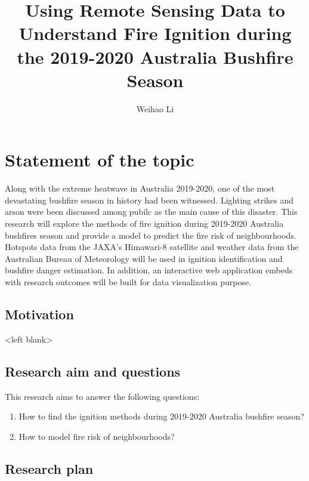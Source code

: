 \documentclass{monashthesis}
\author{Weihao Li}
\title{Using Remote Sensing Data to Understand Fire Ignition during the
2019-2020 Australia Bushfire Season}
\begin{document}

\titlepage

{\sf\tighttoc\doublespacing}

\clearpage{}\setcounter{page}{0}

\chapter{Statement of the topic}\label{ch:intro}

Along with the extreme heatwave in Australia 2019-2020, one of the most
devastating bushfire season in history had been witnessed. Lighting
strikes and arson were been discussed among pubilc as the main cause of
this disaster. This research will explore the methods of fire ignition
during 2019-2020 Australia bushfires season and provide a model to
predict the fire risk of neighbourhoods. Hotspots data from the JAXA's
Himawari-8 satellite and weather data from the Australian Bureau of
Meteorology will be used in ignition identification and bushfire danger
estimation. In addition, an interactive web application embeds with
research outcomes will be built for data visualization purpose.

\section{Motivation}\label{motivation}

\textless{}left blank\textgreater{}

\section{Research aim and questions}\label{research-aim-and-questions}

This research aims to answer the following questions:

\begin{enumerate}
\def\labelenumi{\arabic{enumi}.}
\tightlist
\item
  How to find the ignition methods during 2019-2020 Australia bushfire
  season?
\item
  How to model fire risk of neighbourhoods?
\end{enumerate}

\section{Research plan}\label{research-plan}
\end{document}
